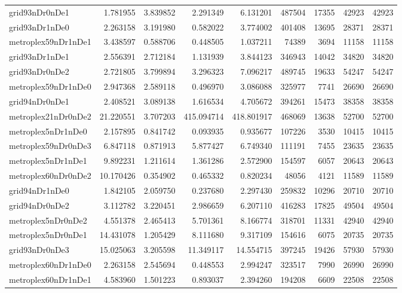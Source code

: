 \begin{longtable}{|l|r|r|r|r|r|r|r|r|}
grid93nDr0nDe1 & 1.781955 & 3.839852 & 2.291349 & 6.131201 & 487504 & 17355 & 42923 & 42923 \\
grid93nDr1nDe0 & 2.263158 & 3.191980 & 0.582022 & 3.774002 & 401408 & 13695 & 28371 & 28371 \\
metroplex59nDr1nDe1 & 3.438597 & 0.588706 & 0.448505 & 1.037211 & 74389 & 3694 & 11158 & 11158 \\
grid93nDr1nDe1 & 2.556391 & 2.712184 & 1.131939 & 3.844123 & 346943 & 14042 & 34820 & 34820 \\
grid93nDr0nDe2 & 2.721805 & 3.799894 & 3.296323 & 7.096217 & 489745 & 19633 & 54247 & 54247 \\
metroplex59nDr1nDe0 & 2.947368 & 2.589118 & 0.496970 & 3.086088 & 325977 & 7741 & 26690 & 26690 \\
grid94nDr0nDe1 & 2.408521 & 3.089138 & 1.616534 & 4.705672 & 394261 & 15473 & 38358 & 38358 \\
metroplex21nDr0nDe2 & 21.220551 & 3.707203 & 415.094714 & 418.801917 & 468069 & 13638 & 52700 & 52700 \\
metroplex5nDr1nDe0 & 2.157895 & 0.841742 & 0.093935 & 0.935677 & 107226 & 3530 & 10415 & 10415 \\
metroplex59nDr0nDe3 & 6.847118 & 0.871913 & 5.877427 & 6.749340 & 111191 & 7455 & 23635 & 23635 \\
metroplex5nDr1nDe1 & 9.892231 & 1.211614 & 1.361286 & 2.572900 & 154597 & 6057 & 20643 & 20643 \\
metroplex60nDr0nDe2 & 10.170426 & 0.354902 & 0.465332 & 0.820234 & 48056 & 4121 & 11589 & 11589 \\
grid94nDr1nDe0 & 1.842105 & 2.059750 & 0.237680 & 2.297430 & 259832 & 10296 & 20710 & 20710 \\
grid94nDr0nDe2 & 3.112782 & 3.220451 & 2.986659 & 6.207110 & 416283 & 17825 & 49504 & 49504 \\
metroplex5nDr0nDe2 & 4.551378 & 2.465413 & 5.701361 & 8.166774 & 318701 & 11331 & 42940 & 42940 \\
metroplex5nDr0nDe1 & 14.431078 & 1.205429 & 8.111680 & 9.317109 & 154616 & 6075 & 20735 & 20735 \\
grid93nDr0nDe3 & 15.025063 & 3.205598 & 11.349117 & 14.554715 & 397245 & 19426 & 57930 & 57930 \\
metroplex60nDr1nDe0 & 2.263158 & 2.545694 & 0.448553 & 2.994247 & 323517 & 7990 & 26990 & 26990 \\
metroplex60nDr1nDe1 & 4.583960 & 1.501223 & 0.893037 & 2.394260 & 194208 & 6609 & 22508 & 22508 \\

\end{longtable}
